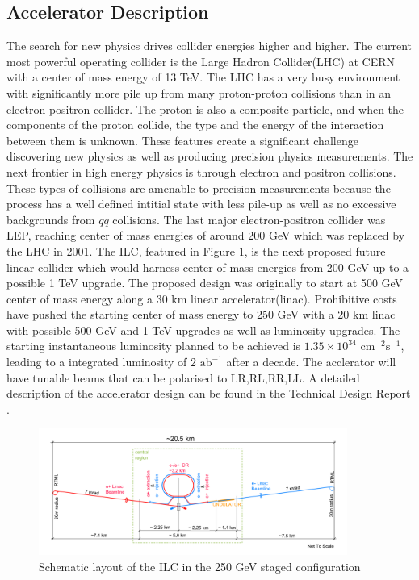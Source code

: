 \subsection{Accelerator Description}
\label{ilc}


The search for new physics drives collider energies higher and higher. The current most powerful operating collider is the Large Hadron Collider(LHC) at CERN with a center of mass energy of 13 TeV. The LHC has a very busy environment with significantly more pile up from many proton-proton collisions than in an electron-positron collider. The proton is also a composite particle, and when the components of the proton collide, the type and the energy of the interaction between them is unknown. These features create a significant challenge discovering new physics as well as producing precision physics measurements. The next frontier in high energy physics is through electron and positron collisions. These types of collisions are amenable to precision measurements because the process has a well defined intitial state with less pile-up as well as no excessive backgrounds from $qq$ collisions. The last major electron-positron collider was LEP, reaching center of mass energies of around 200 GeV which was replaced by the LHC in 2001.  The ILC, featured in Figure \ref{fig:ilc}, is the next proposed future linear collider which would harness center of mass energies from 200 GeV up to a possible 1 TeV upgrade.  The proposed design was originally to start at 500 GeV center of mass energy along a 30 km linear accelerator(linac). Prohibitive costs have pushed the starting center of mass energy to 250 GeV  with a 20 km linac with possible 500 GeV and 1 TeV upgrades as well as luminosity upgrades.  The starting instantaneous luminosity planned to be achieved is $1.35 \times 10^{34} \, \, \text{cm}^{−2}\text{s}^{−1}$, leading to a integrated luminosity of $2 \, \, \text{ab}^{-1}$ after a decade. The acclerator will have tunable beams that can be polarised to LR,RL,RR,LL.\cite{currdetector} A detailed description of the accelerator design can be found in the Technical Design Report \cite{tdraccel}.

\begin{figure}
\label{fig:ilc}
\includegraphics[width=0.9\textwidth]{ilc.pdf}
\caption{Schematic layout of the ILC in the 250 GeV staged configuration \cite{currdetector} }
\end{figure}

